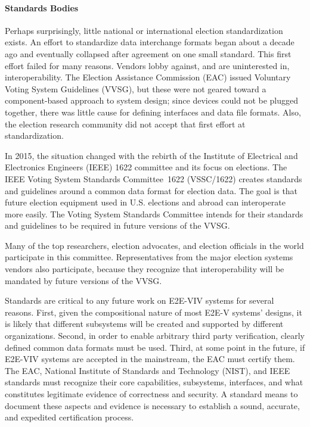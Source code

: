 \paragraph{Standards Bodies} 
Perhaps surprisingly, little national or international election
standardization exists. An effort to standardize data interchange
formats began about a decade ago and eventually collapsed after
agreement on one small standard. This first effort failed for many
reasons. Vendors lobby against, and are uninterested in,
interoperability. The Election Assistance Commission (EAC) issued
Voluntary Voting System Guidelines (VVSG), but these were not geared
toward a component-based approach to system design; since devices
could not be plugged together, there was little cause for defining
interfaces and data file formats. Also, the election research
community did not accept that first effort at standardization.

In 2015, the situation changed with the rebirth of the Institute of
Electrical and Electronics Engineers (IEEE) 1622 committee and its
focus on elections. The IEEE Voting System Standards Committee 1622
(VSSC/1622) creates standards and guidelines around a common data
format for election data. The goal is that future election equipment
used in U.S. elections and abroad can interoperate more easily. The
Voting System Standards Committee intends for their standards and
guidelines to be required in future versions of the VVSG.

Many of the top researchers, election advocates, and election
officials in the world participate in this committee. Representatives
from the major election systems vendors also participate, because they
recognize that interoperability will be mandated by future versions of
the VVSG.

Standards are critical to any future work on E2E-VIV systems for
several reasons. First, given the compositional nature of most E2E-V
systems’ designs, it is likely that different subsystems will be
created and supported by different organizations. Second, in order to
enable arbitrary third party verification, clearly defined common data
formats must be used. Third, at some point in the future, if E2E-VIV
systems are accepted in the mainstream, the EAC must certify them. The
EAC, National Institute of Standards and Technology (NIST), and IEEE
standards must recognize their core capabilities, subsystems,
interfaces, and what constitutes legitimate evidence of correctness
and security. A standard means to document these aspects and evidence
is necessary to establish a sound, accurate, and expedited
certification process.


